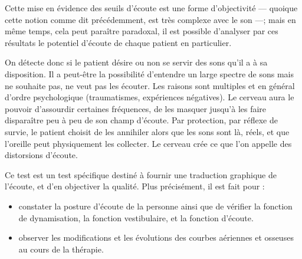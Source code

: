 Cette mise en évidence des seuils d'écoute est une forme d'objectivité
--- quoique cette notion comme dit précédemment, est très complexe
avec le son ---; mais en même temps, cela peut paraître paradoxal, il
est possible d'analyser par ces résultats le potentiel d'écoute de
chaque patient en particulier.

  On détecte donc si le patient désire ou non se servir des sons
  qu'il a à sa disposition. Il a peut-être la possibilité d'entendre un large spectre de
  sons mais ne souhaite pas, ne veut pas les écouter. Les raisons sont multiples et en général d'ordre psychologique (traumatismes,
  expériences négatives). Le cerveau aura le
  pouvoir d'assourdir certaines fréquences, de les masquer jusqu'à les faire disparaître peu à peu de
  son champ d'écoute. Par protection, par réflexe de survie, le
  patient choisit de les
  annihiler alors que les sons sont là, réels, et que  l'oreille peut physiquement les collecter. Le cerveau crée ce
  que l'on appelle des distorsions
  d'écoute\autocite{tomatis:education}.

  
  Ce test est un test spécifique destiné à fournir une traduction
graphique de l'écoute, et d'en objectiver la qualité. Plus précisément,
il  est fait pour :
\begin{itemize}
\item constater la posture d'écoute de la personne ainsi que de vérifier
la fonction de dynamisation, la fonction vestibulaire,
et la fonction d'écoute.
\item observer les modifications et les évolutions des courbes
  aériennes et osseuses au cours
de la thérapie.
\end{itemize}


